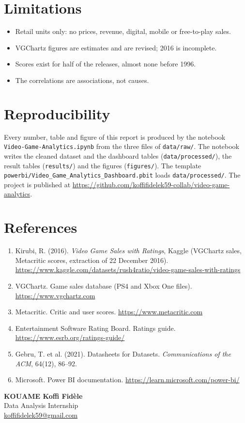 \documentclass[12pt,a4paper]{article}
\begin{document}
\section{Limitations}
\begin{itemize}
\item Retail units only: no prices, revenue, digital, mobile or free-to-play sales.
\item VGChartz figures are estimates and are revised; 2016 is incomplete.
\item Scores exist for half of the releases, almost none before 1996.
\item The correlations are associations, not causes.
\end{itemize}

\section{Reproducibility}

Every number, table and figure of this report is produced by the notebook
\nolinkurl{Video-Game-Analytics.ipynb} from the three files of \nolinkurl{data/raw/}. The
notebook writes the cleaned dataset and the dashboard tables (\nolinkurl{data/processed/}),
the result tables (\nolinkurl{results/}) and the figures (\nolinkurl{figures/}). The template
\nolinkurl{powerbi/Video_Game_Analytics_Dashboard.pbit} loads \nolinkurl{data/processed/}.
The project is published at \url{https://github.com/koffifidelek59-collab/video-game-analytics}.

\section*{References}
{\small\begin{enumerate}[itemsep=0pt]
\item Kirubi, R. (2016). \emph{Video Game Sales with Ratings}, Kaggle (VGChartz sales, Metacritic scores, extraction of 22 December 2016). \url{https://www.kaggle.com/datasets/rush4ratio/video-game-sales-with-ratings}
\item VGChartz. Game sales database (PS4 and Xbox One files). \url{https://www.vgchartz.com}
\item Metacritic. Critic and user scores. \url{https://www.metacritic.com}
\item Entertainment Software Rating Board. Ratings guide. \url{https://www.esrb.org/ratings-guide/}
\item Gebru, T. et al. (2021). Datasheets for Datasets. \emph{Communications of the ACM}, 64(12), 86--92.
\item Microsoft. Power BI documentation. \url{https://learn.microsoft.com/power-bi/}
\end{enumerate}}

\enlargethispage{4\baselineskip}
\vspace{0.1cm}
\noindent\hfill\begin{minipage}{7cm}\begin{flushright}\singlespacing
\textbf{KOUAME Koffi Fid\`ele}\\
Data Analysis Internship\\
\href{mailto:koffifidelek59@gmail.com}{koffifidelek59@gmail.com}
\end{flushright}\end{minipage}
\end{document}
